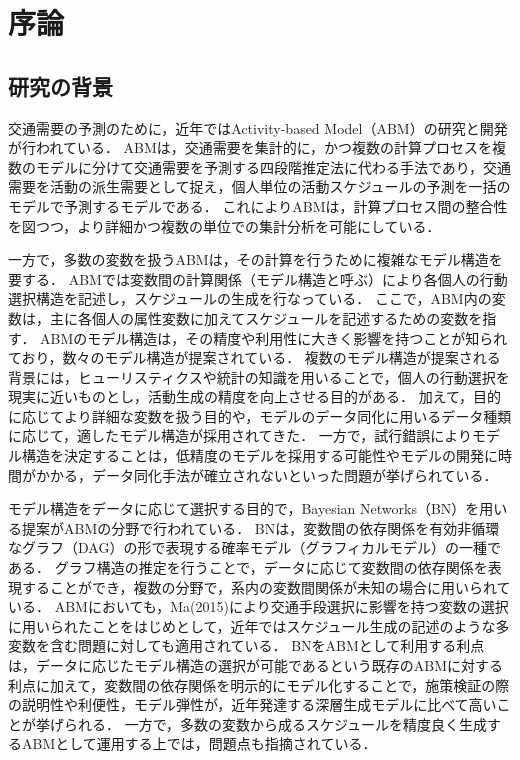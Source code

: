 \chapter{序論} 
\label{1}
\section{研究の背景}\label{1.1}
交通需要の予測のために，近年ではActivity-based Model（ABM）の研究と開発が行われている．
ABMは，交通需要を集計的に，かつ複数の計算プロセスを複数のモデルに分けて交通需要を予測する四段階推定法に代わる手法であり，交通需要を活動の派生需要として捉え，個人単位の活動スケジュールの予測を一括のモデルで予測するモデルである\cite{Baydin2018}．
これによりABMは，計算プロセス間の整合性を図つつ\cite{Baydin2018}，より詳細かつ複数の単位での集計分析を可能にしている．

一方で，多数の変数を扱うABMは，その計算を行うために複雑なモデル構造を要する．
ABMでは変数間の計算関係（モデル構造と呼ぶ）により各個人の行動選択構造を記述し，スケジュールの生成を行なっている．
ここで，ABM内の変数は，主に各個人の属性変数に加えてスケジュールを記述するための変数を指す．
ABMのモデル構造は，その精度や利用性に大きく影響を持つことが知られており\cite{Baydin2018}，数々のモデル構造が提案されている．
複数のモデル構造が提案される背景には，ヒューリスティクスや統計の知識を用いることで，個人の行動選択を現実に近いものとし，活動生成の精度を向上させる目的がある\cite{Baydin2018}．
加えて，目的に応じてより詳細な変数を扱う目的や\cite{Baydin2018}，モデルのデータ同化に用いるデータ種類に応じて\cite{Baydin2018}，適したモデル構造が採用されてきた．
一方で，試行錯誤によりモデル構造を決定することは，低精度のモデルを採用する可能性やモデルの開発に時間がかかる，データ同化手法が確立されないといった問題が挙げられている\cite{Baydin2018}．

モデル構造をデータに応じて選択する目的で，Bayesian Networks（BN）を用いる提案がABMの分野で行われている．
BNは，変数間の依存関係を有効非循環なグラフ（DAG）の形で表現する確率モデル（グラフィカルモデル）の一種である．
グラフ構造の推定を行うことで，データに応じて変数間の依存関係を表現することができ，複数の分野で，系内の変数間関係が未知の場合に用いられている\cite{Baydin2018}．
ABMにおいても，Ma(2015)\cite{Baydin2018}により交通手段選択に影響を持つ変数の選択に用いられたことをはじめとして，近年ではスケジュール生成の記述のような多変数を含む問題に対しても適用されている\cite{Baydin2018}．
BNをABMとして利用する利点は，データに応じたモデル構造の選択が可能であるという既存のABMに対する利点に加えて，変数間の依存関係を明示的にモデル化することで，施策検証の際の説明性や利便性，モデル弾性が，近年発達する深層生成モデルに比べて高いことが挙げられる\cite{Baydin2018}．
一方で，多数の変数から成るスケジュールを精度良く生成するABMとして運用する上では，問題点も指摘されている．

